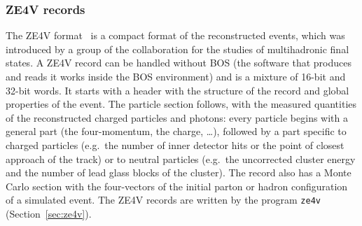 \subsubsection{ZE4V records}
The ZE4V format~\cite{JCN:99} is a compact format of the reconstructed events, which was introduced by a group of the
collaboration for the studies of multihadronic final states. A ZE4V record can be handled without BOS (the software that
produces and reads it works inside the BOS environment) and is a mixture of 16-bit and 32-bit words. It starts with a header
with the structure of the record and global properties of the event. The particle section follows, with the measured
quantities of the reconstructed charged particles and photons: every particle begins with a general part (the four-momentum,
the charge, \dots), followed by a part specific to charged particles (e.g.\ the number of inner detector hits or the point of
closest approach of the track) or to neutral particles (e.g.\ the uncorrected cluster energy and the number of lead glass blocks
of the cluster). The record also has a Monte Carlo section with the four-vectors of the initial parton or hadron configuration of
a simulated event. The ZE4V records are written by the program \texttt{ze4v} (Section~\ref{sec:ze4v}).

